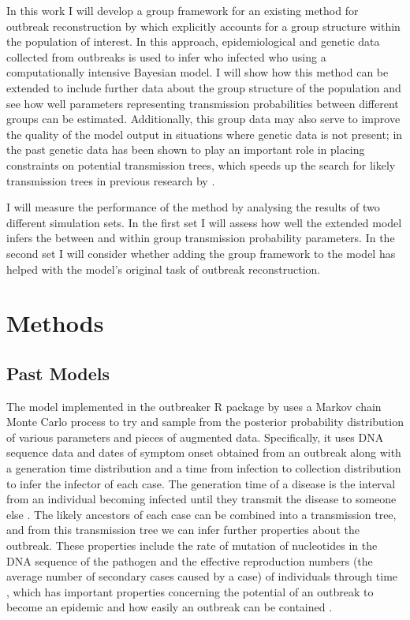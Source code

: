 \documentclass[11pt,a4paper]{report}
\begin{document}
In this work I will develop a group framework for an existing method for outbreak reconstruction by \citet{outbrkr} which explicitly accounts for a group structure within the population of interest. In this approach, epidemiological and genetic data collected from outbreaks is used to infer who infected who using a computationally intensive Bayesian model. I will show how this method can be extended to include further data about the group structure of the population and see how well parameters representing transmission probabilities between different groups can be estimated. Additionally, this group data may also serve to improve the quality of the model output in situations where genetic data is not present; in the past genetic data has been shown to play an important role in placing constraints on potential transmission trees, which speeds up the search for likely transmission trees in previous research by \citet{outbrkr}. 

I will measure the performance of the method by analysing the results of two different simulation sets. In the first set I will assess how well the extended model infers the between and within group transmission probability parameters. In the second set I will consider whether adding the group framework to the model has helped with the model's original task of outbreak reconstruction. 


\chapter{Methods}

\section{Past Models}
The model implemented in the outbreaker R package by \citet{outbrkr} uses a Markov chain Monte Carlo process to try and sample from the posterior probability distribution of various parameters and pieces of augmented data. Specifically, it uses DNA sequence data and dates of symptom onset obtained from an outbreak along with a generation time distribution and a time from infection to collection distribution to infer the infector of each case. The generation time of a disease is the interval from an individual becoming infected until they transmit the disease to someone else \citep{Anderson92}. The likely ancestors of each case can be combined into a transmission tree, and from this transmission tree we can infer further properties about the outbreak. These properties include the rate of mutation of nucleotides in the DNA sequence of the pathogen and the effective reproduction numbers (the average number of secondary cases caused by a case) of individuals through time \citep{outbrkr}, which has important properties concerning the potential of an outbreak to become an epidemic \citep{Grassly08} and how easily an outbreak can be contained \citep{Wallinga04}.
\end{document}
